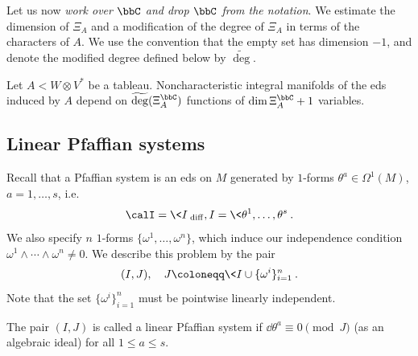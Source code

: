 Let us now \emph{work over $\bbC$ and drop $\bbC$ from the notation}. We estimate the dimension of $\Xi_A$ and a modification of the degree of $\Xi_A$ in terms of the characters of $A$. We use the convention that the empty set has dimension $-1$, and denote the modified degree defined below by $\widetilde{\deg}$.

\begin{thm}\label{thm 5.6.12 Ivey}
    Let $A<W\otimes V^\ast$ be a tableau. Noncharacteristic integral manifolds of the \gls{eds} induced by $A$ depend on $\widetilde{\deg}(\Xi_A^\bbC)$ functions of $\dim\Xi_A^\bbC+1$ variables.
\end{thm}






\subsection{Linear Pfaffian systems}


Recall that a Pfaffian system is an \gls{eds} on $M$ generated by $1$-forms $\theta^a\in \Omega^1(M)$, $a=1,\ldots,s$, i.e.\ 
\[\calI=\<I\>_{\mathrm{diff}}, I=\<\theta^1,\ldots,\theta^s\>.\]
We also specify $n$ $1$-forms $\{\omega^1,\ldots,\omega^n\}$,  which induce our independence condition $\omega^1\wedge\cdots\wedge\omega^n\neq 0$. We describe this problem by the pair 
\[(I,J),\quad J\coloneqq \<I\cup\{\omega^i\}_{i=1}^n\>.\]
Note that the set $\{\omega^i\}_{i=1}^n$ must be pointwise linearly independent.

\begin{defn}
    The pair $(I,J)$ is called a linear Pfaffian system if $\dd \theta^a\equiv 0\pmod{J}$ (as an algebraic ideal) for all $1\leq a\leq s$.
\end{defn}


